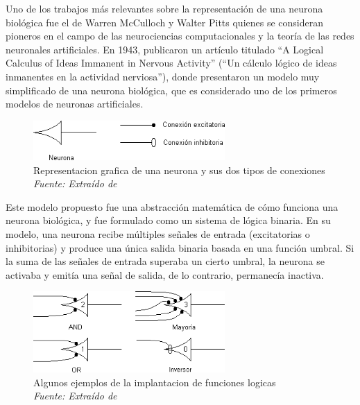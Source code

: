 Uno de los trabajos más relevantes sobre la representación de una neurona biológica fue el de Warren McCulloch y Walter Pitts quienes se consideran  pioneros en el campo de las neurociencias computacionales y la teoría de las redes neuronales artificiales. En 1943, publicaron un artículo titulado ``A Logical Calculus of Ideas Immanent in Nervous Activity'' (``Un cálculo lógico de ideas inmanentes en la actividad nerviosa''), donde presentaron un modelo muy simplificado de una neurona biológica, que es considerado uno de los primeros modelos de neuronas artificiales\cite{mcculloch1943logical}.

\begin{figure}[h!]
	\includegraphics[width=0.65\textwidth]{capitulo2/figuras/an2.png}
	\caption[Representacion grafica de una neurona y sus dos tipos de conexiones]{Representacion grafica de una neurona y sus dos tipos de conexiones\\\textit{Fuente: Extraído de} \protect\cite[ p.4]{prieto2020modelo} }
	\label{fig:an2}
\end{figure}

Este modelo propuesto  fue una abstracción matemática de cómo funciona una neurona biológica, y fue formulado como un sistema de lógica binaria. En su modelo, una neurona recibe múltiples señales de entrada (excitatorias o inhibitorias) y produce una única salida binaria basada en una función umbral. Si la suma de las señales de entrada superaba un cierto umbral, la neurona se activaba y emitía una señal de salida, de lo contrario, permanecía inactiva.

\begin{figure}[h!]
	\includegraphics[width=0.65\textwidth]{capitulo2/figuras/an3.png}
	\caption[Algunos ejemplos de la implantacion de funciones logicas]{Algunos ejemplos de la implantacion de funciones logicas
		\\\textit{Fuente: Extraído de} \protect\cite[p. 5]{prieto2020modelo} }
	\label{fig:an3}
\end{figure}

